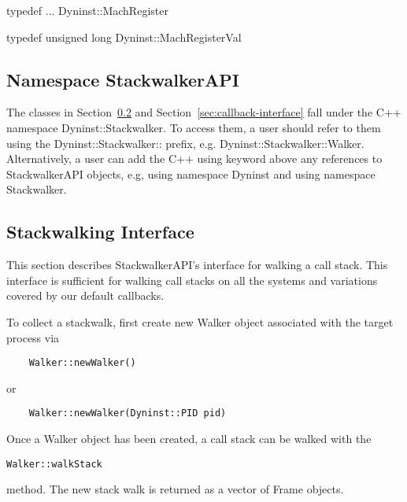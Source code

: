 \begin{apient}
typedef ... Dyninst::MachRegister
\end{apient}

\begin{apient}
typedef unsigned long Dyninst::MachRegisterVal
\end{apient}
    
\subsection{Namespace StackwalkerAPI}
The classes in Section~\ref{sec:stackwalking-interface} and
Section~\ref{sec:callback-interface} fall under the C++ namespace
Dyninst::Stackwalker. To access them, a user should refer to them using the
Dyninst::Stackwalker:: prefix, e.g. Dyninst::Stackwalker::Walker. Alternatively,
a user can add the C++ using keyword above any references to StackwalkerAPI
objects, e.g, using namespace Dyninst and using namespace Stackwalker.
    
\subsection{Stackwalking Interface}
\label{sec:stackwalking-interface}

This section describes StackwalkerAPI's interface for walking a call stack. This
interface is sufficient for walking call stacks on all the systems and
variations covered by our default callbacks. 

To collect a stackwalk, first create new Walker object associated with the target process via

\begin{lstlisting}
    Walker::newWalker()
\end{lstlisting}
	or 
\begin{lstlisting}
    Walker::newWalker(Dyninst::PID pid)
\end{lstlisting}

Once a Walker object has been created, a call stack can be walked with the
\begin{lstlisting}
Walker::walkStack
\end{lstlisting}
method. The new stack walk is returned as a vector of Frame objects.
    
